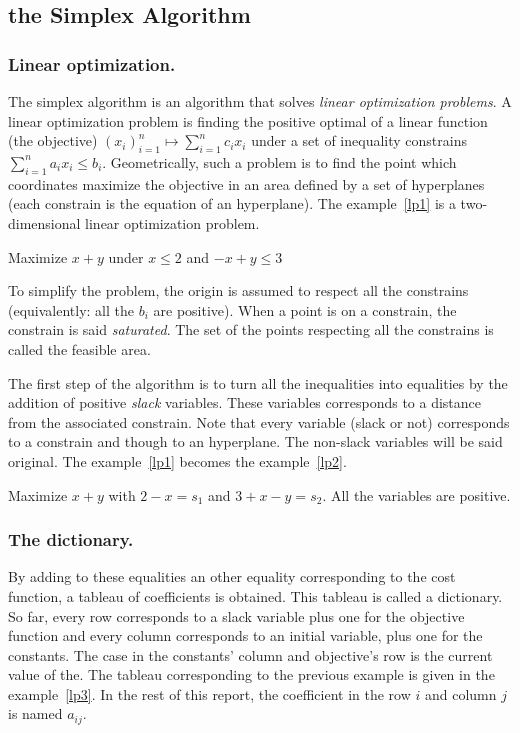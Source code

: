 \subsection{the Simplex Algorithm}
\subsubsection{Linear optimization.}
The simplex algorithm is an algorithm that solves \emph{linear optimization problems}. A linear optimization problem is finding the positive optimal of a linear function (the objective) $(x_i)_{i=1}^n \mapsto \sum_{i=1}^n c_i x_i$  under a set of inequality constrains $\sum_{i=1}^n a_i x_i \leq b_i$. Geometrically, such a problem is to find the point which coordinates maximize the objective in an area defined by a set of hyperplanes (each constrain is the equation of an hyperplane). The example~\ref{lp1} is a two-dimensional linear optimization problem.

\begin{example}
	Maximize $x+y$ under $x\leq 2$ and $-x+y\leq 3$
	\label{lp1}
\end{example}

To simplify the problem, the origin is assumed to respect all the constrains (equivalently: all the $b_i$ are positive). When a point is on a constrain, the constrain is said \emph{saturated}. The set of the points respecting all the constrains is called the feasible area. 

The first step of the algorithm is to turn all the inequalities into equalities by the addition of positive \emph{slack} variables. These variables corresponds to a distance from the associated constrain. Note that every variable (slack or not) corresponds to a constrain and though to an hyperplane. The non-slack variables will be said original. The example~\ref{lp1} becomes the example~\ref{lp2}.

\begin{example}
	Maximize $x+y$ with $2-x=s_1$ and $3+x-y=s_2$. All the variables are positive.
	\label{lp2}
\end{example}
\subsubsection{The dictionary.}
By adding to these equalities an other equality corresponding to the cost function, a tableau of coefficients is obtained. This tableau is called a dictionary. So far, every row corresponds to a slack variable plus one for the objective function and every column corresponds to an initial variable, plus one for the constants. The case in the constants' column and objective's row is the current value of the. The tableau corresponding to the previous example is given in the example~\ref{lp3}. In the rest of this report, the coefficient in the row $i$ and column $j$ is named $a_{ij}$.

